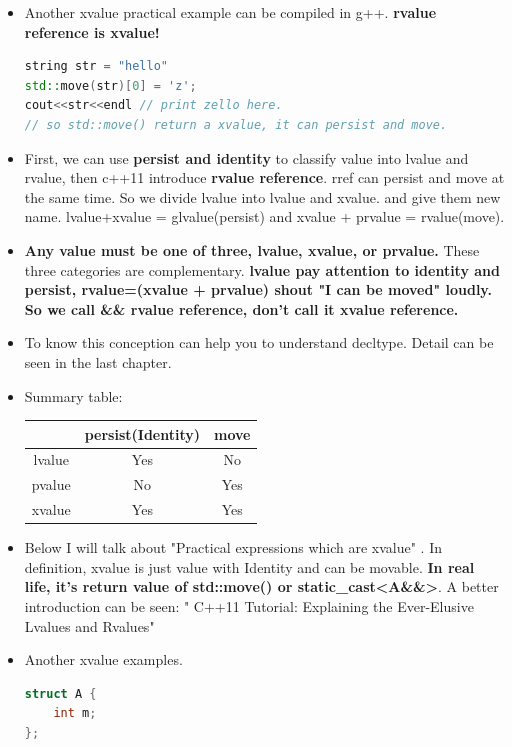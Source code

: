 \documentclass[a4paper,12pt,twoside]{book}
\begin{document}
\begin{itemize}
\item Another xvalue practical example can be compiled in g++.  \textbf{rvalue reference is xvalue!}
\begin{lstlisting}[frame=single, language=c++, mathescape=true]
string str = "hello"
std::move(str)[0] = 'z';
cout<<str<<endl // print zello here.
// so std::move() return a xvalue, it can persist and move.
\end{lstlisting}

\item First, we can use \textbf{persist and identity} to classify value into lvalue and rvalue, then c++11 introduce \textbf{rvalue reference}. rref can persist and move at the same time.  So we divide lvalue into lvalue and xvalue.  and give them new name.  lvalue+xvalue = glvalue(persist)  and xvalue + prvalue = rvalue(move).

\item \textbf{Any value must be one of three, lvalue, xvalue, or prvalue.} These three categories are complementary.  \textbf{lvalue pay attention to  identity and persist, rvalue=(xvalue + prvalue) shout "I can be moved" loudly.  So we call \&\& rvalue reference, don't call it xvalue reference. }

\item To know this conception can help you to understand decltype. Detail can be seen in the last chapter.

\item Summary table:
\begin{tabular}{|c|c|c|}
\hline
 & persist(Identity) & move \\
\hline
lvalue & Yes & No \\
\hline
pvalue & No & Yes \\
\hline
xvalue & Yes & Yes \\
\hline
\end{tabular}


\item Below I will talk about "Practical expressions which are xvalue" . In definition,  xvalue is just value with Identity and can be movable. \textbf{In real life, it's  return value of std::move() or static\_cast<A\&\&>}. A better introduction can be seen: " C++11 Tutorial: Explaining the Ever-Elusive Lvalues and Rvalues"

\item Another xvalue examples.
\begin{lstlisting}[frame=single, language=c++]
struct A {
    int m;
};


\end{lstlisting}
\end{itemize}
\end{document}

